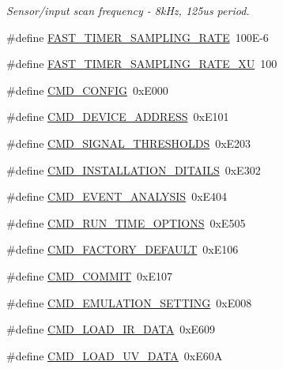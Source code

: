 \begin{DoxyCompactItemize}
\begin{DoxyCompactList}\small\item\em Sensor/input scan frequency -\/ 8k\+Hz, 125us period. \end{DoxyCompactList}\item 
\#define \hyperlink{a00031_a3a4dcb8af26a561d90607a41a3745806}{F\+A\+S\+T\+\_\+\+T\+I\+M\+E\+R\+\_\+\+S\+A\+M\+P\+L\+I\+N\+G\+\_\+\+R\+A\+T\+E}~100\+E-\/6
\item 
\#define \hyperlink{a00031_a87ea9a0eaa474d8b8f672cfa5cbb091f}{F\+A\+S\+T\+\_\+\+T\+I\+M\+E\+R\+\_\+\+S\+A\+M\+P\+L\+I\+N\+G\+\_\+\+R\+A\+T\+E\+\_\+\+X\+U}~100
\item 
\#define \hyperlink{a00031_aa87bfa4fccf7f7a4fc45afb1966a655f}{C\+M\+D\+\_\+\+C\+O\+N\+F\+I\+G}~0x\+E000
\item 
\#define \hyperlink{a00031_a7c6a5f4023cb02d02f2ded23147be425}{C\+M\+D\+\_\+\+D\+E\+V\+I\+C\+E\+\_\+\+A\+D\+D\+R\+E\+S\+S}~0x\+E101
\item 
\#define \hyperlink{a00031_ac361dc1b32c1036394be0fd7de1182ca}{C\+M\+D\+\_\+\+S\+I\+G\+N\+A\+L\+\_\+\+T\+H\+R\+E\+S\+H\+O\+L\+D\+S}~0x\+E203
\item 
\#define \hyperlink{a00031_af91ff280feea1f52e3bdd7f0f556d153}{C\+M\+D\+\_\+\+I\+N\+S\+T\+A\+L\+L\+A\+T\+I\+O\+N\+\_\+\+D\+I\+T\+A\+I\+L\+S}~0x\+E302
\item 
\#define \hyperlink{a00031_a3a15793e3ab7817f2429edf04de693a0}{C\+M\+D\+\_\+\+E\+V\+E\+N\+T\+\_\+\+A\+N\+A\+L\+Y\+S\+I\+S}~0x\+E404
\item 
\#define \hyperlink{a00031_a1d8673a7ca545f3e382fc538f543ab72}{C\+M\+D\+\_\+\+R\+U\+N\+\_\+\+T\+I\+M\+E\+\_\+\+O\+P\+T\+I\+O\+N\+S}~0x\+E505
\item 
\#define \hyperlink{a00031_a8ad7dae51114833acbb665d703d8ffeb}{C\+M\+D\+\_\+\+F\+A\+C\+T\+O\+R\+Y\+\_\+\+D\+E\+F\+A\+U\+L\+T}~0x\+E106
\item 
\#define \hyperlink{a00031_a7df85bf97a6a032220d7a71c78be5206}{C\+M\+D\+\_\+\+C\+O\+M\+M\+I\+T}~0x\+E107
\item 
\#define \hyperlink{a00031_a230386ac00f9c01793857101e1680324}{C\+M\+D\+\_\+\+E\+M\+U\+L\+A\+T\+I\+O\+N\+\_\+\+S\+E\+T\+T\+I\+N\+G}~0x\+E008
\item 
\#define \hyperlink{a00031_a8c7ce698ee79d20e30eb0ac08f0d9abc}{C\+M\+D\+\_\+\+L\+O\+A\+D\+\_\+\+I\+R\+\_\+\+D\+A\+T\+A}~0x\+E609
\item 
\#define \hyperlink{a00031_a8904f57ef5850374dbcdbe67eb8a5543}{C\+M\+D\+\_\+\+L\+O\+A\+D\+\_\+\+U\+V\+\_\+\+D\+A\+T\+A}~0x\+E60\+A
\item 

\end{DoxyCompactItemize}
